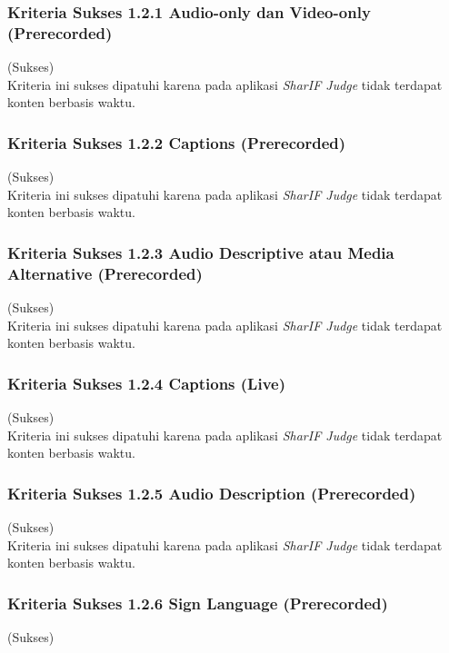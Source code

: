 \subsubsection{Kriteria Sukses 1.2.1 Audio-only dan Video-only (Prerecorded)}
\label{subsubsec:kepatuhan_kriteria_1.2.1}
(Sukses) \\

Kriteria ini sukses dipatuhi karena pada aplikasi \textit{SharIF Judge} tidak terdapat konten berbasis waktu.

\subsubsection{Kriteria Sukses 1.2.2 Captions (Prerecorded)}
\label{subsubsec:kepatuhan_kriteria_1.2.2}
(Sukses) \\

Kriteria ini sukses dipatuhi karena pada aplikasi \textit{SharIF Judge} tidak terdapat konten berbasis waktu.

\subsubsection{Kriteria Sukses 1.2.3 Audio Descriptive atau Media Alternative (Prerecorded)}
\label{subsubsec:kepatuhan_kriteria_1.2.3}
(Sukses) \\

Kriteria ini sukses dipatuhi karena pada aplikasi \textit{SharIF Judge} tidak terdapat konten berbasis waktu.

\subsubsection{Kriteria Sukses 1.2.4 Captions (Live)}
\label{subsubsec:kepatuhan_kriteria_1.2.4}
(Sukses) \\

Kriteria ini sukses dipatuhi karena pada aplikasi \textit{SharIF Judge} tidak terdapat konten berbasis waktu.

\subsubsection{Kriteria Sukses 1.2.5 Audio Description (Prerecorded)}
\label{subsubsec:kepatuhan_kriteria_1.2.5}
(Sukses) \\

Kriteria ini sukses dipatuhi karena pada aplikasi \textit{SharIF Judge} tidak terdapat konten berbasis waktu.

\subsubsection{Kriteria Sukses 1.2.6 Sign Language (Prerecorded)}
\label{subsubsec:kepatuhan_kriteria_1.2.6}
(Sukses) \\

